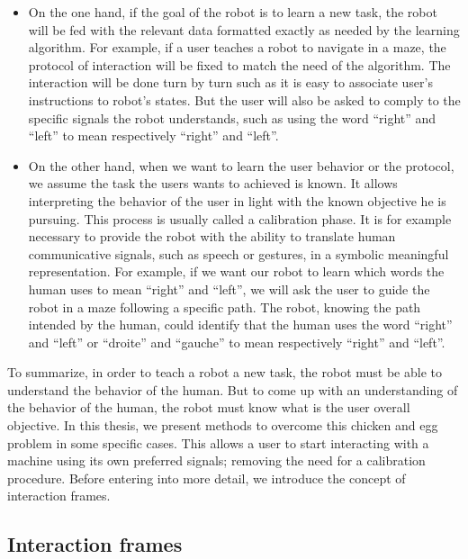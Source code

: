 \begin{itemize}

\item On the one hand, if the goal of the robot is to learn a new task, the robot will be fed with the relevant data formatted exactly as needed by the learning algorithm. For example, if a user teaches a robot to navigate in a maze, the protocol of interaction will be fixed to match the need of the algorithm. The interaction will be done turn by turn such as it is easy to associate user's instructions to robot's states. But the user will also be asked to comply to the specific signals the robot understands, such as using the word ``right'' and ``left'' to mean respectively ``right'' and ``left''.

\item On the other hand, when we want to learn the user behavior or the protocol, we assume the task the users wants to achieved is known. It allows interpreting the behavior of the user in light with the known objective he is pursuing. This process is usually called a calibration phase. It is for example necessary to provide the robot with the ability to translate human communicative signals, such as speech or gestures, in a symbolic meaningful representation. For example, if we want our robot to learn which words the human uses to mean ``right'' and ``left'', we will ask the user to guide the robot in a maze following a specific path. The robot, knowing the path intended by the human, could identify that the human uses the word ``right'' and ``left'' or ``droite'' and ``gauche'' to mean respectively ``right'' and ``left''.

\end{itemize}

To summarize, in order to teach a robot a new task, the robot must be able to understand the behavior of the human. But to come up with an understanding of the behavior of the human, the robot must know what is the user overall objective. In this thesis, we present methods to overcome this chicken and egg problem in some specific cases. This allows a user to start interacting with a machine using its own preferred signals; removing the need for a calibration procedure. Before entering into more detail, we introduce the concept of interaction frames.

\subsection{Interaction frames}

